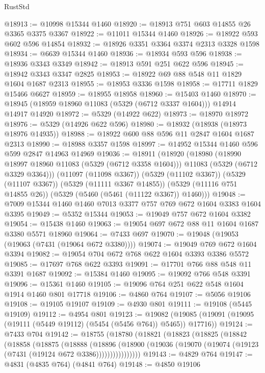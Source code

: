 \begin{lexlean}{RustStd}
\begin{coremodule}
@18913 := @10998 @15344 @1460
@18920 := @18913 @751 @603 @14855 @26 @3365 @3375 @3367
@18922 := @11011 @15344 @1460
@18926 := @18922 @593 @602 @596 @14854
@18932 := @18926 @3351 @3364 @3374 @2313 @3328 @1598
@18934 := @6639 @15344 @1460
@18936 := @18934 @593 @596
@18938 := @18936 @3343 @3349
@18942 := @18913 @591 @251 @622 @596
@18945 := @18942 @3343 @3347 @2825
@18953 := @18922 @69 @88 @548 @11 @1829 @1604 @1687 @2313
@18955 := @18953 @3336 @1598
@18958 := @17711 @1829 @15466 @6627
@18959 := @18955 @18958
@18960 := @15403 @1460
@18970 := @18945 (@18959 @18960 @11083 (@5329 (@6712 @3337 @1604))) @14914 @14917 @14920
@18972 := @5329 (@14922 @622)
@18973 := @18970 @18972
@18976 := @5329 (@14926 @622 @596)
@18980 := @18932 (@18938 (@18973 @18976 @14935))
@18988 := @18922 @600 @88 @596 @11 @2847 @1604 @1687 @2313
@18990 := @18988 @3357 @1598
@18997 := @14952 @15344 @1460 @596 @599 @2847 @14963 @14969
@19036 := @18911
    (@18920
      (@18980
        (@18990 @18997 @18960 @11083 (@5329 (@6712 @3358 @1604)))
        @11083
        (@5329 (@6712 @3329 @3364)))
      (@11097 (@11098 @3367))
      (@5329 (@11102 @3367))
      (@5329 (@11107 @3367))
      (@5329 (@11111 @3367 @14855))
      (@5329 (@11116 @751 @14855 @26))
      (@5329 (@5460 (@5461 (@11122 @3367)) @1460)))
@19048 := @7009 @15344 @1460 @1460 @7013 @3377 @757 @769 @672 @1604 @3383 @1604 @3395
@19049 := @5352 @15344
@19053 := @19049 @757 @672 @1604 @3382
@19054 := @15438 @1460
@19063 := @19054 @697 @672 @88 @11 @1604 @1687 @3380 @5571 @18960
@19064 := @7433 @697
@19070 := @19048 (@19053 (@19063 (@7431 (@19064 @672 @3380))))
@19074 := @19049 @769 @672 @1604 @3394
@19082 := @19054 @704 @672 @768 @622 @1604 @3393 @3386 @5572
@19085 := @17697 @768 @622 @3393
@19091 := @17701 @766 @88 @548 @11 @3391 @1687
@19092 := @15384 @1460
@19095 := @19092 @766 @548 @3391
@19096 := @15361 @1460
@19105 := @19096 @764 @251 @622 @548 @1604 @1914 @1460 @801 @17718
@19106 := @4860 @764
@19107 := @5056 @19106
@19108 := @19105 @19107
@19109 := @4930 @801
@19111 := @19108 (@5445 @19109)
@19112 := @4954 @801
@19123 := @19082
    (@19085 (@19091 (@19095 (@19111 (@5449 @19112) (@5454 (@5456 @764)) @5465)) @17716))
@19124 := @7433 @704
@19142 := @18755
    (@18780
      (@18821
        (@18823
          (@18825
            (@18842
              (@18858
                (@18875
                  (@18888
                    (@18896
                      (@18900
                        (@19036 (@19070 (@19074 (@19123 (@7431 (@19124 @672 @3386))))))))))))))))
@19143 := @4829 @764
@19147 := @4831 (@4835 @764) (@4841 @764)
@19148 := @4850 @19106

\end{coremodule}
\end{lexlean}
